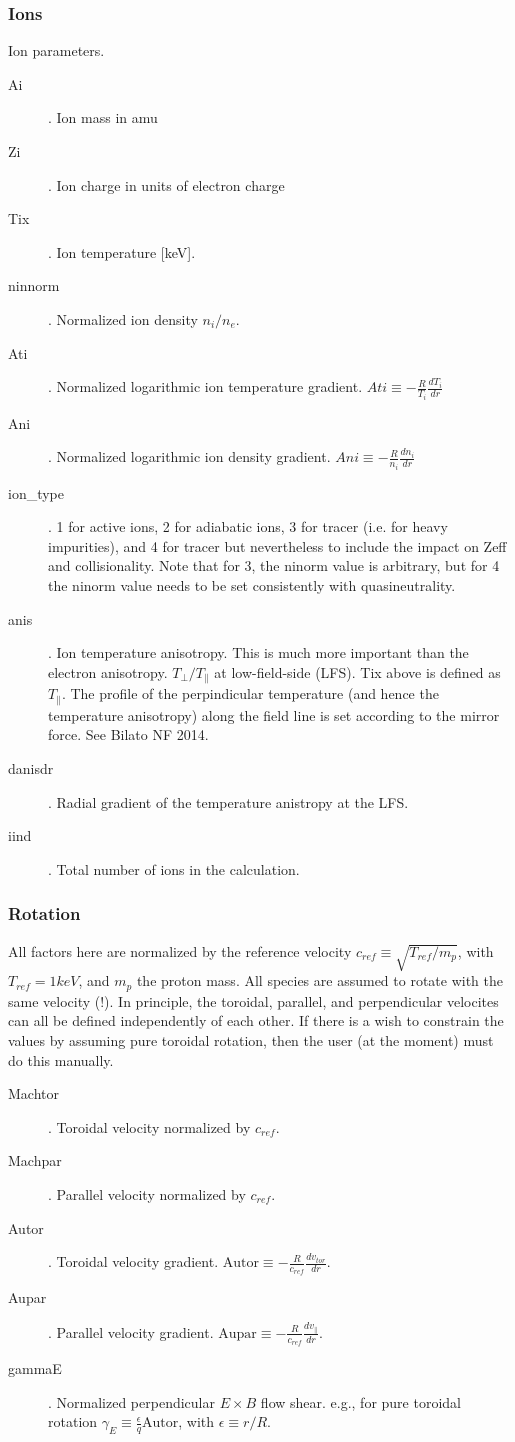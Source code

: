 \documentclass{article}
\begin{document}
\subsubsection{Ions}
Ion parameters.
\begin{description}
\item[Ai]. Ion mass in amu
\item[Zi]. Ion charge in units of electron charge
\item[Tix]. Ion temperature [keV].
\item[ninnorm]. Normalized ion density $n_i/n_e$.
\item[Ati]. Normalized logarithmic ion temperature gradient. $Ati{\equiv}-\frac{R}{T_i}\frac{dT_i}{dr}$
\item[Ani]. Normalized logarithmic ion density gradient. $Ani{\equiv}-\frac{R}{n_i}\frac{dn_i}{dr}$
\item[ion\_type]. 1 for active ions, 2 for adiabatic ions, 3 for tracer (i.e. for heavy impurities), and 4 for tracer but nevertheless to include the impact on Zeff and collisionality. Note that for 3, the ninorm value is arbitrary, but for 4 the ninorm value needs to be set consistently with quasineutrality.
\item[anis]. Ion temperature anisotropy. This is much more important than the electron anisotropy. $T_\perp/T_\parallel$ at low-field-side (LFS). Tix above is defined as $T_\parallel$. The profile of the perpindicular temperature (and hence the temperature anisotropy) along the field line is set according to the mirror force. See Bilato NF 2014.
\item[danisdr]. Radial gradient of the temperature anistropy at the LFS.
\item[iind]. Total number of ions in the calculation.
\end{description}
\subsubsection{Rotation}
All factors here are normalized by the reference velocity $c_{ref}\equiv\sqrt{T_{ref}/m_p}$, with $T_{ref}=1 keV$, and $m_p$ the proton mass. All species are assumed to rotate with the same velocity (!). In principle, the toroidal, parallel, and perpendicular velocites can all be defined independently of each other. If there is a wish to constrain the values by assuming pure toroidal rotation, then the user (at the moment) must do this manually. 
\begin{description}
\item[Machtor]. Toroidal velocity normalized by $c_{ref}$.
\item[Machpar]. Parallel velocity normalized by $c_{ref}$. 
\item[Autor]. Toroidal velocity gradient. $\mathrm{Autor}{\equiv}-\frac{R}{c_{ref}}\frac{dv_{tor}}{dr}$.
\item[Aupar]. Parallel velocity gradient. $\mathrm{Aupar}{\equiv}-\frac{R}{c_{ref}}\frac{dv_\parallel}{dr}$.
\item[gammaE]. Normalized perpendicular $E{\times}B$ flow shear. e.g., for pure toroidal rotation $\gamma_E{\equiv}\frac{\epsilon}{q}\mathrm{Autor}$, with $\epsilon{\equiv}r/R$.
\end{description}
\end{document}
